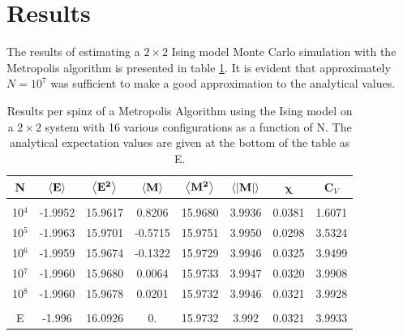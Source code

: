 \documentclass[%
reprint,nofootinbib,
amsmath,amssymb,
aps,
]{revtex4-1}
\begin{document}
\section{Results} \noindent
The results of estimating a $2\times 2$ Ising model Monte Carlo simulation with the Metropolis algorithm is presented in table \ref{2b}. It is evident that approximately $N=10^7$ was sufficient to make a good approximation to the analytical values. 
\begin{table}[!h]
	\caption{\label{2b}Results per spinz of a Metropolis Algorithm using the Ising model on a $2\times 2$ system with 16 various configurations as a function of N. The analytical expectation values are given at the bottom of the table as E. }
	\begin{tabular}{|c|c|c|c|c|c|c|c|} \hline 
		\textbf{N}  & \hspace{1mm}	$\expval{\mathbf{E}}$ \hspace{1mm} & \hspace{1mm}$\expval{\mathbf{E^2}}$ \hspace{1mm} & \hspace{1mm}	$\expval{\mathbf{M}}$\hspace{1mm}  &	\hspace{1mm} $\expval{\mathbf{M^2}}$ \hspace{1mm}  &	\hspace{1mm}$\expval{\abs{\mathbf{M}}} $\hspace{1mm} & \hspace{2mm}$\mathbf{\chi}$	\hspace{2mm} & \hspace{2mm}	\textbf{C}$_V$\hspace{2mm} \\ \hline 
		&&&&&&&\\
		10$^4$   &          -1.9952   & 15.9617  &  0.8206 &   15.9680 &   3.9936&   0.0381 &   1.6071\\
		10$^5$   &          -1.9963   & 15.9701  &  -0.5715 &   15.9751 &   3.9950&   0.0298 &   3.5324\\  
		10$^6$   &          -1.9959   & 15.9674  &  -0.1322 &   15.9729 &   3.9946&   0.0325 &   3.9499\\  
		10$^7$   &          -1.9960   & 15.9680  &  0.0064 &   15.9733 &   3.9947&   0.0320 &   3.9908\\ 
		10$^8$   &          -1.9960   & 15.9678  &  0.0201 &   15.9732 &   3.9946&   0.0321 &   3.9928\\
		&&&&&&&\\ \hline 
		E &-1.996 & 16.0926  &0.&     15.9732&  3.992 &  0.0321 & 3.9933 \\ \hline 
	\end{tabular}
\end{table}\\ 
\end{document}
